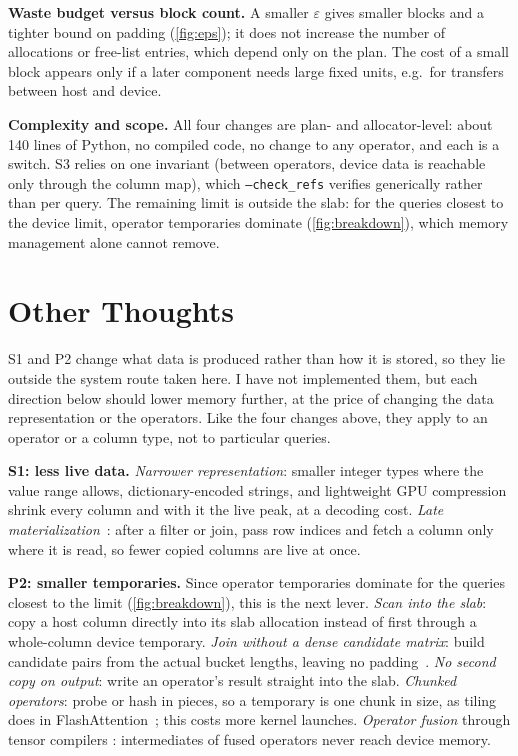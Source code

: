\documentclass[10pt,twocolumn,letterpaper]{article}
\newcommand{\code}[1]{\texttt{\small #1}}
\begin{document}
\textbf{Waste budget versus block count.} A smaller $\varepsilon$ gives smaller blocks and a
tighter bound on padding (\cref{fig:eps}); it does not increase the number of allocations or
free-list entries, which depend only on the plan. The cost of a small block appears only
if a later component needs large fixed units, e.g.\ for transfers between host and device.

\textbf{Complexity and scope.} All four changes are plan- and allocator-level: about 140
lines of Python, no compiled code, no change to any operator, and each is a switch. S3
relies on one invariant (between operators, device data is reachable only through the
column map), which \code{--check\_refs} verifies generically rather than per query. The
remaining limit is outside the slab: for the queries closest to the device limit, operator
temporaries dominate (\cref{fig:breakdown}), which memory management alone cannot remove.

\section{Other Thoughts}
\label{sec:other}
S1 and P2 change what data is produced rather than how it is stored, so they lie outside the
system route taken here. I have not implemented them, but each direction below should lower
memory further, at the price of changing the data representation or the operators. Like the
four changes above, they apply to an operator or a column type, not to particular queries.

\textbf{S1: less live data.} \emph{Narrower representation}: smaller integer types where the
value range allows, dictionary-encoded strings, and lightweight GPU compression
\cite{shanbhag2022tile} shrink every column and with it the live peak, at a decoding cost.
\emph{Late materialization}~\cite{abadi2007materialization}: after a filter or join, pass row
indices and fetch a column only where it is read, so fewer copied columns are live at once.

\textbf{P2: smaller temporaries.} Since operator temporaries dominate for the queries closest
to the limit (\cref{fig:breakdown}), this is the next lever. \emph{Scan into the slab}: copy a
host column directly into its slab allocation instead of first through a whole-column device
temporary. \emph{Join without a dense candidate matrix}: build candidate pairs from the actual
bucket lengths, leaving no padding~\cite{fegade2022cora}. \emph{No second copy on output}: write
an operator's result straight into the slab. \emph{Chunked operators}: probe or hash in pieces,
so a temporary is one chunk in size, as tiling does in FlashAttention~\cite{dao2022flashattention};
this costs more kernel launches. \emph{Operator fusion} through tensor compilers
\cite{ansel2024pytorch2,cui2026tqppp}: intermediates of fused operators never reach device memory.
\end{document}
